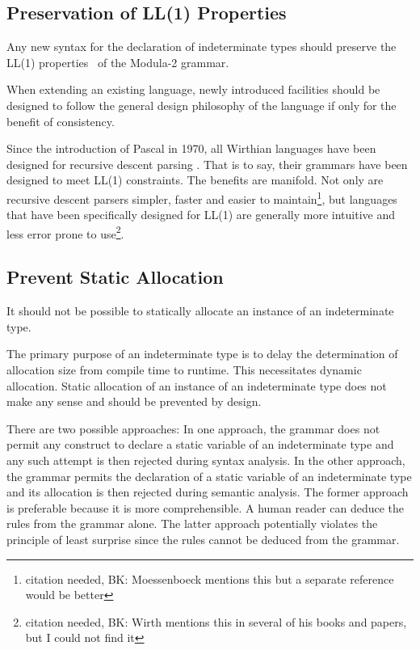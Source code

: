 \documentclass[10pt,a4paper]{article}
\begin{document}
\subsection{Preservation of LL(1) Properties}

Any new syntax for the declaration of indeterminate types should preserve the
LL(1) properties~\cite{Lewis68} of the Modula-2 grammar.\\

\par\noindent
When extending an existing language, newly introduced facilities should be
designed to follow the general design philosophy of the language if only for
the benefit of consistency. 

Since the introduction of Pascal \cite{JW74} in 1970, all Wirthian languages
have been designed for recursive descent parsing \cite[p.5]{Moessenboeck00}.
That is to say, their grammars have been designed to meet LL(1) constraints.
The benefits are manifold. Not only are recursive descent parsers simpler,
faster and easier to maintain\footnote{citation needed, BK: Moessenboeck
mentions this but a separate reference would be better}, but languages that
have been specifically designed for LL(1) are generally more intuitive and
less error prone to use\footnote{citation needed, BK: Wirth mentions this in
several of his books and papers, but I could not find it}.


\subsection{Prevent Static Allocation}

It should not be possible to statically allocate an instance of an
indeterminate type.\\

\par\noindent The primary purpose of an indeterminate type is to delay the
determination of allocation size from compile time to runtime. This
necessitates dynamic allocation. Static allocation of an instance of an
indeterminate type does not make any sense and should be prevented by
design.

There are two possible approaches: In one approach, the grammar does not
permit any construct to declare a static variable of an indeterminate
type and any such attempt is then rejected during syntax analysis. In the
other approach, the grammar permits the declaration of a static variable
of an indeterminate type and its allocation is then rejected during
semantic analysis. The former approach is preferable because it is more
comprehensible. A human reader can deduce the rules from the grammar alone.
The latter approach potentially violates the principle of least surprise
\cite{Geoffrey87} since the rules cannot be deduced from the grammar.
\end{document}

